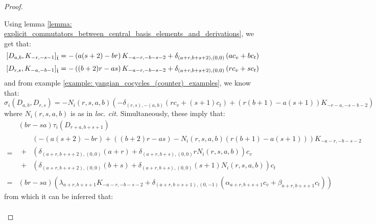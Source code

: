 \begin{proof}
\begin{enumerate}
$$                        $$
                    Using lemma \ref{lemma: explicit_commutators_between_central_basis_elements_and_derivations}, we get that:
                        $$[D_{a, b}, K_{-r, -s - 1}]_{\extendedtoroidal} = -\left( a(s + 2) - br \right) K_{-a - r, -b - s - 2} + \delta_{(a + r, b + s + 2), (0, 0)} \left( a c_v + b c_t \right)$$
                        $$[D_{r, s}, K_{-a, -b - 1}]_{\extendedtoroidal} = -\left( (b + 2) r - as \right) K_{-a - r, -b - s - 2} + \delta_{(a + r, b + s + 2), (0, 0)} \left( r c_v + s c_t \right)$$
                    and from example \ref{example: yangian_cocycles_(counter)_examples}, we know that:
                        $$\sigma_i(D_{a, b}, D_{r, s}) = -N_i(r, s, a, b) \left( -\delta_{(r, s), -(a, b)} (r c_v + (s + 1) c_t) + ( r(b + 1) - a(s + 1) )K_{-r - a, -s - b - 2} \right)$$
                    where $N_i(r, s, a, b)$ is as in \textit{loc. cit.} Simultaneously, these imply that:
                        $$
                            \begin{aligned}
                                & (br - sa) \tau_i(D_{r + a, b + s + 1})
                                \\
                                = &
                                \begin{aligned}
                                    & \left( -\left( a(s + 2) - br \right) + \left( (b + 2) r - as \right) - N_i(r, s, a, b)( r(b + 1) - a(s + 1) ) \right) K_{-a - r, -b - s - 2}
                                    \\
                                    + & \left( \delta_{(a + r, b + s + 2), (0, 0)} (a + r) + \delta_{(a + r, b + s), (0, 0)} r N_i(r, s, a, b) \right) c_v
                                    \\
                                    + & \left( \delta_{(a + r, b + s + 2), (0, 0)} (b + s) + \delta_{(a + r, b + s), (0, 0)} (s + 1)N_i(r, s, a, b) \right) c_t
                                \end{aligned}
                                \\
                                = & (br - sa) \left( \lambda_{a + r, b + s + 1} K_{-a - r, -b - s - 2} + \delta_{(a + r, b + s + 1), (0, -1)}( \alpha_{a + r, b + s + 1} c_v + \beta_{a + r, b + s + 1} c_t ) \right)
                            \end{aligned}
                        $$
                    from which it can be inferred that:
                        $$
                            \begin{aligned}

\end{aligned}$$
\end{enumerate}
\end{proof}
